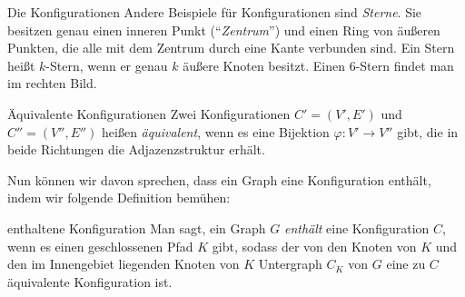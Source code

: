 \begin{section}{Die Konfigurationen}
  Andere Beispiele für Konfigurationen sind \textit{Sterne}. Sie besitzen genau einen inneren Punkt (``\textit{Zentrum}'') und einen Ring von äußeren Punkten, die alle mit dem Zentrum durch eine Kante verbunden sind. Ein Stern heißt $k$-Stern, wenn er genau $k$ äußere Knoten besitzt. Einen $6$-Stern findet man im rechten Bild.
  
  \begin{definition}{Äquivalente Konfigurationen}
   Zwei Konfigurationen $C'=(V',E')$ und $C''=(V'',E'')$ heißen \textit{äquivalent}, wenn es eine Bijektion $\varphi : V' \rightarrow V''$ gibt, die in beide Richtungen die Adjazenzstruktur erhält.
  \end{definition}
  
  Nun können wir davon sprechen, dass ein Graph eine Konfiguration enthält, indem wir folgende Definition bemühen:
  
  \begin{definition}{enthaltene Konfiguration}
   Man sagt, ein Graph $G$ \textit{enthält} eine Konfiguration $C$, wenn es einen geschlossenen Pfad $K$ gibt, sodass der von den Knoten von $K$ und den im Innengebiet liegenden Knoten von $K$ Untergraph $C_K$ von $G$ eine zu $C$ äquivalente Konfiguration ist.
  \end{definition}


  \end{section}
\newpage